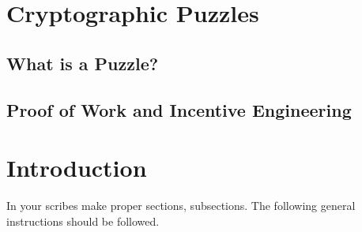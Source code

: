 \documentclass[10pt,a4paper]{article}
\begin{document}
\section{Cryptographic Puzzles}

\subsection{What is a Puzzle?}
\subsection{Proof of Work and Incentive Engineering}




\section{Introduction}
In your scribes make proper sections, subsections.
The following general instructions should be followed.
\end{document}
